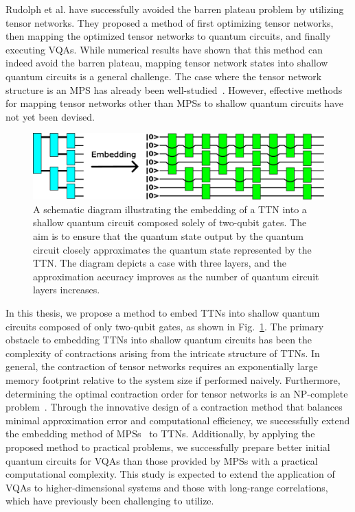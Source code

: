 \documentclass[12pt,dvipdfmx,twoside,openright]{report}
\begin{document}
Rudolph et al. have successfully avoided the barren plateau problem by utilizing tensor networks\cite{rudolph2023synergistic}.
They proposed a method of first optimizing tensor networks, then mapping the optimized tensor networks to quantum circuits, and finally executing VQAs.
While numerical results have shown that this method can indeed avoid the barren plateau, mapping tensor network states into shallow quantum circuits is a general challenge.
The case where the tensor network structure is an MPS has already been well-studied~\cite{EncodingMPS,mpsdecomp,mpsoptim,mpspreparation}.
However, effective methods for mapping tensor networks other than MPSs to shallow quantum circuits have not yet been devised.
\begin{figure}
    \centering
    \includegraphics[width=\linewidth]{fig-task-setting.pdf}
    \caption{A schematic diagram illustrating the embedding of a TTN into a shallow quantum circuit composed solely of two-qubit gates. The aim is to ensure that the quantum state output by the quantum circuit closely approximates the quantum state represented by the TTN. The diagram depicts a case with three layers, and the approximation accuracy improves as the number of quantum circuit layers increases.}
    \label{fig:task-setting}
\end{figure}

In this thesis, we propose a method to embed TTNs into shallow quantum circuits composed of only two-qubit gates, as shown in Fig.~\ref{fig:task-setting}.
The primary obstacle to embedding TTNs into shallow quantum circuits has been the complexity of contractions arising from the intricate structure of TTNs.
In general, the contraction of tensor networks requires an exponentially large memory footprint relative to the system size if performed naively.
Furthermore, determining the optimal contraction order for tensor networks is an NP-complete problem~\cite{np-complete}.
Through the innovative design of a contraction method that balances minimal approximation error and computational efficiency, we successfully extend the embedding method of MPSs~\cite{mpsdecomp} to TTNs.
Additionally, by applying the proposed method to practical problems, we successfully prepare better initial quantum circuits for VQAs than those provided by MPSs with a practical computational complexity.
This study is expected to extend the application of VQAs to higher-dimensional systems and those with long-range correlations, which have previously been challenging to utilize.
\end{document}
